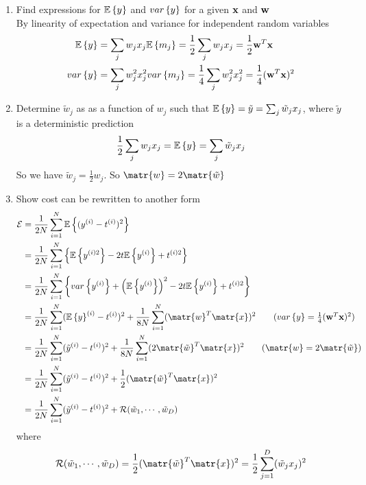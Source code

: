 \documentclass[11pt]{article}
\begin{document}
\begin{enumerate}
\begin{enumerate}
    \item Find expressions for $\mathbb{E}\left\{y\right\}$ and $var\left\{y\right\}$ for a given $\mathbf{x}$ and $\mathbf{w}$\\
    By linearity of expectation and variance for independent random variables 
    \begin{align*}
        \mathbb{E}\left\{y\right\} &= \sum_j w_j x_j \mathbb{E}\left\{m_j\right\} = \frac{1}{2} \sum_j w_j x_j = \frac{1}{2} \mathbf{w}^T \mathbf{x}\\
        var\left\{y\right\} &= \sum_j w_j^2 x_j^2 var\left\{m_j\right\} = \frac{1}{4} \sum_j w_j^2 x_j^2 = \frac{1}{4} (\mathbf{w}^T \mathbf{x})^2 \\ 
    \end{align*}
    \item Determine $\tilde{w}_j$ as as a function of $w_j$ such that $\mathbb{E}\left\{y\right\} = \tilde{y} =  \sum_j \tilde{w}_j x_j$, where $\tilde{y}$ is a deterministic prediction
    \[
        \frac{1}{2} \sum_j w_j x_j = \mathbb{E}\left\{y\right\} = \sum_j \tilde{w}_j x_j   
    \]
    So we have $\tilde{w}_j = \frac{1}{2} w_j$. So $\matr{w} = 2 \matr{\tilde{w}}$
    \item Show cost can be rewritten to another form 
    \begin{align*}
        \mathcal{E} 
        &= \frac{1}{2N} \sum_{i=1}^N \E{(y^{(i)} - t^{(i)})^2} \\ 
        &= \frac{1}{2N} \sum_{i=1}^N \left\{ \E{y^{(i)2}} - 2t\E{y^{(i)}} + t^{(i)2} \right\} \\ 
        &= \frac{1}{2N} \sum_{i=1}^N \left\{ \var{y^{(i)}} + \left(\E{y^{(i)}}\right)^2 - 2t\E{y^{(i)}} + t^{(i)2} \right\}\\ 
        &= \frac{1}{2N} \sum_{i=1}^N (\E{y}^{(i)} - t^{(i)})^2 + \frac{1}{8N} \sum_{i=1}^N (\matr{w}^T \matr{x})^2 \tag{$\var{y} =  \frac{1}{4} (\bw^T \bx)^2$}\\ 
        &= \frac{1}{2N} \sum_{i=1}^N (\tilde{y}^{(i)} - t^{(i)})^2 + \frac{1}{8N} \sum_{i=1}^N (2\matr{\tilde{w}}^T \matr{x})^2 \tag{$\matr{w} = 2\matr{\tilde{w}}$}\\ 
        &= \frac{1}{2N} \sum_{i=1}^N (\tilde{y}^{(i)} - t^{(i)})^2 + \frac{1}{2} (\matr{\tilde{w}}^T \matr{x})^2\\ 
        &= \frac{1}{2N} \sum_{i=1}^N (\tilde{y}^{(i)} - t^{(i)})^2 + \mathcal{R}(\tilde{w}_1, \cdots, \tilde{w}_D) \\ 
    \end{align*}
    where 
    \[
        \mathcal{R}(\tilde{w}_1, \cdots, \tilde{w}_D) = \frac{1}{2} (\matr{\tilde{w}}^T \matr{x})^2 = \frac{1}{2}  \sum_{j=1}^D (\tilde{w}_j x_j)^2
    \]
\end{enumerate}

\end{enumerate}
\end{document}
